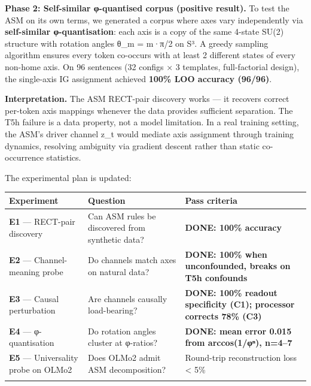 \documentclass[
  twocolumn,
  10pt,
  a4paper]{article}
\newenvironment{tsxtable}{\begin{center}\footnotesize}{\end{center}}
\let\endhead\relax
\begin{document}
\textbf{Phase 2: Self-similar φ-quantised corpus (positive result).} To
test the ASM on its own terms, we generated a corpus where axes vary
independently via \textbf{self-similar φ-quantisation}: each axis is a
copy of the same 4-state SU(2) structure with rotation angles θ\_m =
m·π/2 on S³. A greedy sampling algorithm ensures every token co-occurs
with at least 2 different states of every non-home axis. On 96 sentences
(32 configs × 3 templates, full-factorial design), the single-axis IG
assignment achieved \textbf{100\% LOO accuracy (96/96)}.

\textbf{Interpretation.} The ASM RECT-pair discovery works --- it
recovers correct per-token axis mappings whenever the data provides
sufficient separation. The T5h failure is a data property, not a model
limitation. In a real training setting, the ASM's driver channel z\_t
would mediate axis assignment through training dynamics, resolving
ambiguity via gradient descent rather than static co-occurrence
statistics.

The experimental plan is updated:

\begin{tsxtable}\begin{tabularx}{\linewidth}{@{}
  >{\raggedright\arraybackslash}p{}
  >{\raggedright\arraybackslash}p{}
  >{\raggedright\arraybackslash}p{}@{}}
\toprule\noalign{}
\begin{minipage}[b]{\linewidth}\raggedright
Experiment
\end{minipage} & \begin{minipage}[b]{\linewidth}\raggedright
Question
\end{minipage} & \begin{minipage}[b]{\linewidth}\raggedright
Pass criteria
\end{minipage} \\
\midrule\noalign{}
\endhead
\textbf{E1} --- RECT-pair discovery & Can ASM rules be discovered from
synthetic data? & \textbf{DONE: 100\% accuracy} \\
\textbf{E2} --- Channel-meaning probe & Do channels match axes on
natural data? & \textbf{DONE: 100\% when unconfounded, breaks on T5h
confounds} \\
\textbf{E3} --- Causal perturbation & Are channels causally
load-bearing? & \textbf{DONE: 100\% readout specificity (C1); processor
corrects 78\% (C3)} \\
\textbf{E4} --- φ-quantisation & Do rotation angles cluster at φ-ratios?
& \textbf{DONE: mean error 0.015 from arccos(1/φⁿ), n=4--7} \\
\textbf{E5} --- Universality probe on OLMo2 & Does OLMo2 admit ASM
decomposition? & Round-trip reconstruction loss \textless{} 5\% \\
\bottomrule\noalign{}
\end{tabularx}\end{tsxtable}
\end{document}
